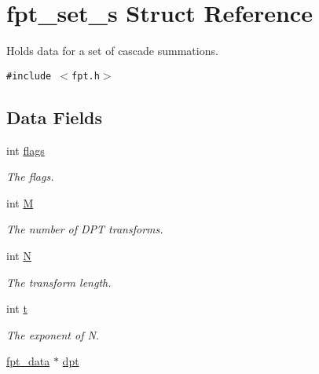 \hypertarget{structfpt__set__s}{
\section{fpt\_\-set\_\-s Struct Reference}
\label{structfpt__set__s}
}
Holds data for a set of cascade summations.  


{\tt \#include $<$fpt.h$>$}

\subsection*{Data Fields}
\begin{CompactItemize}
\item 
\hypertarget{structfpt__set__s_edea90ea36bd52716ab88d95117660ad}{
int \hyperlink{structfpt__set__s_edea90ea36bd52716ab88d95117660ad}{flags}}
\label{structfpt__set__s_edea90ea36bd52716ab88d95117660ad}

\begin{CompactList}\small\item\em The flags. \item\end{CompactList}\item 
\hypertarget{structfpt__set__s_0b331c8ad987abe23a05a77f3c3f6211}{
int \hyperlink{structfpt__set__s_0b331c8ad987abe23a05a77f3c3f6211}{M}}
\label{structfpt__set__s_0b331c8ad987abe23a05a77f3c3f6211}

\begin{CompactList}\small\item\em The number of DPT transforms. \item\end{CompactList}\item 
int \hyperlink{structfpt__set__s_79ef24e290c43364646520ab94cf43e5}{N}
\begin{CompactList}\small\item\em The transform length. \item\end{CompactList}\item 
\hypertarget{structfpt__set__s_4ba60e2cce448ea70d4cc773454fd553}{
int \hyperlink{structfpt__set__s_4ba60e2cce448ea70d4cc773454fd553}{t}}
\label{structfpt__set__s_4ba60e2cce448ea70d4cc773454fd553}

\begin{CompactList}\small\item\em The exponent of N. \item\end{CompactList}\item 
\hypertarget{structfpt__set__s_83cab05366d06e3e442865967c7b9ca1}{
\hyperlink{structfpt__data}{fpt\_\-data} $\ast$ \hyperlink{structfpt__set__s_83cab05366d06e3e442865967c7b9ca1}{dpt}}
\label{structfpt__set__s_83cab05366d06e3e442865967c7b9ca1}


\end{CompactItemize}
